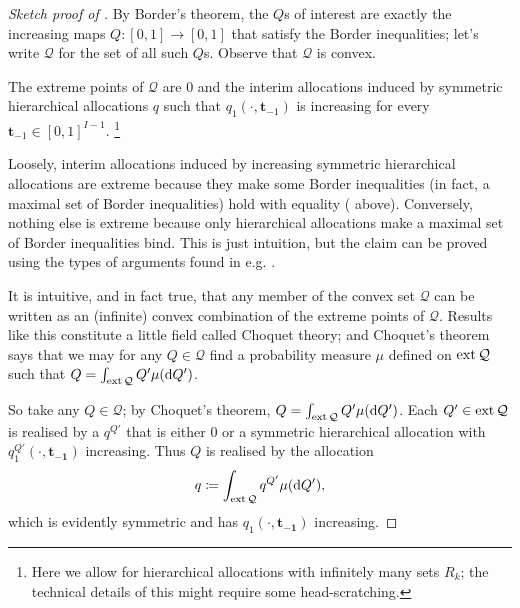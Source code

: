 \begin{proof}[Sketch proof of ]
	By Border's theorem, the $Q$s of interest
	are exactly the increasing maps $Q : [0,1] \to [0,1]$ that satisfy the Border inequalities;
	let's write $\mathcal{Q}$ for the set of all such $Q$s.
	Observe that $\mathcal{Q}$ is convex.

	\begin{claim}
		\label{claim:manellivincent_extr}
		The extreme points of $\mathcal{Q}$
		are $0$ and the interim allocations induced by symmetric hierarchical allocations $q$ such that $q_1(\cdot,\boldsymbol{t}_{-1})$ is increasing for every $\boldsymbol{t}_{-1} \in [0,1]^{I-1}$.%
			\footnote{Here we allow for hierarchical allocations with infinitely many sets $R_k$; the technical details of this might require some head-scratching.}
	\end{claim}

	Loosely, interim allocations induced by increasing symmetric hierarchical allocations are extreme because they make some Border inequalities (in fact, a maximal set of Border inequalities) hold with equality ( above).
	Conversely, nothing else is extreme because only hierarchical allocations make a maximal set of Border inequalities bind.
	This is just intuition, but the claim can be proved using the types of arguments found in e.g. \textcite{KleinerMoldovanuStrack2021}.

	It is intuitive, and in fact true, that any member of the convex set $\mathcal{Q}$ can be written as an (infinite) convex combination of the extreme points of $\mathcal{Q}$.
	Results like this constitute a little field called Choquet theory;
	and Choquet's theorem says that
	we may for any $Q \in \mathcal{Q}$ find a probability measure $\mu$ defined on $\operatorname*{ext} \mathcal{Q}$ such that $Q = \int_{\operatorname*{ext} \mathcal{Q}} Q' \mu( \mathrm{d} Q' )$.

	So take any $Q \in \mathcal{Q}$;
	by Choquet's theorem, $Q = \int_{\operatorname*{ext} \mathcal{Q}} Q' \mu( \mathrm{d} Q' )$.
	Each $Q' \in \operatorname*{ext} \mathcal{Q}$ is realised by a $q^{Q'}$
	that is either $0$ or a symmetric hierarchical allocation with $q^{Q'}_1(\cdot,\boldsymbol{t_{-1}})$ increasing.
	Thus $Q$ is realised by the allocation
	\begin{equation*}
		q \coloneqq \int_{\operatorname*{ext} \mathcal{Q}} q^{Q'} \mu( \mathrm{d} Q' ) ,
	\end{equation*}
	which is evidently symmetric and has $q_1(\cdot,\boldsymbol{t_{-1}})$ increasing.
\end{proof}

